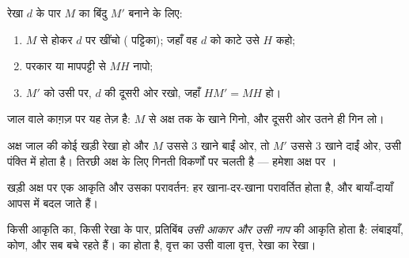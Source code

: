 \begin{method}[सममित बिंदु बनाना]\label{met:g6:symmetry:construct}
रेखा $d$ के पार $M$ का  बिंदु $M'$ बनाने के लिए:
\begin{enumerate}
  \item $M$ से होकर $d$ पर  खींचो ( पट्टिका); जहाँ वह
        $d$ को काटे उसे $H$ कहो;
  \item परकार या मापपट्टी से $MH$ नापो;
  \item $M'$ को उसी  पर, $d$ की दूसरी ओर रखो, जहाँ
        $HM' = MH$ हो।
\end{enumerate}
जाल वाले काग़ज़ पर यह तेज़ है: $M$ से अक्ष तक के खाने गिनो, और
दूसरी ओर उतने ही गिन लो।
\end{method}

\begin{example}[जाल पर]\label{ex:g6:symmetry:grid}
अक्ष जाल की कोई खड़ी रेखा हो और $M$ उससे $3$ खाने बाईं ओर, तो
$M'$ उससे $3$ खाने दाईं ओर, उसी पंक्ति में होता है। तिरछी अक्ष के
लिए गिनती विकर्णों पर चलती है --- हमेशा अक्ष पर ।
\end{example}

\begin{omfigure}

{\small खड़ी अक्ष पर एक आकृति और उसका परावर्तन: हर 
खाना-दर-खाना परावर्तित होता है, और बायाँ-दायाँ आपस में बदल जाते हैं।}
\end{omfigure}

\begin{proposition}[परावर्तन क्या बचाए रखता है]\label{prop:g6:symmetry:preserved}
किसी आकृति का, किसी रेखा के पार,  प्रतिबिंब \emph{उसी
आकार और उसी नाप} की आकृति होता है: लंबाइयाँ, कोण,  और
 सब बचे रहते हैं।  का   होता है,
वृत्त का उसी  वाला वृत्त, रेखा का रेखा।
\end{proposition}
\admitted

